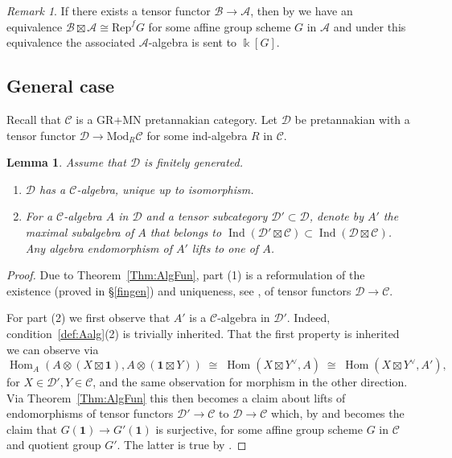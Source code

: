 \documentclass[11pt]{amsart}
\def\Ind{\operatorname{Ind}}
\def\Hom{\operatorname{Hom}}
\def\Ds{\mathscr{D}}
\def\cA{\mathscr{A}}
\def\cC{\mathscr{C}}
\def\bk{\Bbbk}
\def\Mod{\mathrm{Mod}}
\def\cB{\mathscr{B}}
\newtheorem{lemma}[thm]{Lemma}
\theoremstyle{definition}
\theoremstyle{remark}
\newtheorem{remark}[thm]{Remark}
\numberwithin{equation}{section}
\newcommand{\unit}{\mathbf{1}}
\begin{document}
\begin{remark}\label{rem:AkG}
    If there exists a tensor functor $\cB\to\cA$, then by \cite[\S 8]{Del90} we have an equivalence $\cB\boxtimes\cA\cong \mathrm{Rep}^fG$ for some affine group scheme $G$ in $\cA$ and under this equivalence the associated $\cA$-algebra is sent to $\bk[G]$.
\end{remark}



\subsection{General case}\label{general}

Recall that $\cC$ is a GR+MN pretannakian category. Let $\Ds$ be pretannakian with a tensor functor $\Ds\to\Mod_R\cC$ for some ind-algebra $R$ in $\cC$.


\begin{lemma}\label{lem:reformulate} Assume that $\Ds$ is finitely generated.
    \begin{enumerate}
        \item $\Ds$ has a $\cC$-algebra, unique up to isomorphism.
        \item For a $\cC$-algebra $A$ in $\Ds$ and a tensor subcategory $\Ds'\subset\Ds$, denote by $A'$ the maximal subalgebra of $A$ that belongs to $\Ind(\Ds'\boxtimes\cC)\subset\Ind(\Ds\boxtimes\cC)$. Any algebra endomorphism of $A'$ lifts to one of $A$.
    \end{enumerate}
\end{lemma}
\begin{proof}
    Due to Theorem~\ref{Thm:AlgFun}, part (1) is a reformulation of the existence (proved in \S \ref{fingen}) and uniqueness, see \cite[Proposition~7.3.2]{CEO}, of tensor functors $\Ds\to\cC$.

    For part (2) we first observe that $A'$ is a $\cC$-algebra in $\Ds'$. Indeed, condition~\ref{def:Aalg}(2) is trivially inherited. That the first property is inherited we can observe via
    \[\Hom_A(A\otimes (X\boxtimes\unit),A\otimes (\unit\boxtimes Y))\;\cong\; \Hom( X\boxtimes Y^\vee,A)\;\cong\;\Hom( X\boxtimes Y^\vee,A'),\]
    for $X\in\Ds',Y\in\cC$, and the same observation for morphism in the other direction.
 Via Theorem~\ref{Thm:AlgFun} this then becomes a claim about lifts of endomorphisms of tensor functors $\Ds'\to\cC$ to $\Ds\to\cC$ which, by \cite[Th\'eor\`eme~8.17]{Del90} and \cite[Theorem~4.3.1]{CEO} becomes the claim that $G(\unit)\to G'(\unit)$ is surjective, for some affine group scheme $G$ in $\cC$ and quotient group $G'$. The latter is true by \cite[Porism~7.2.6]{C1}.
\end{proof} 
\end{document}
